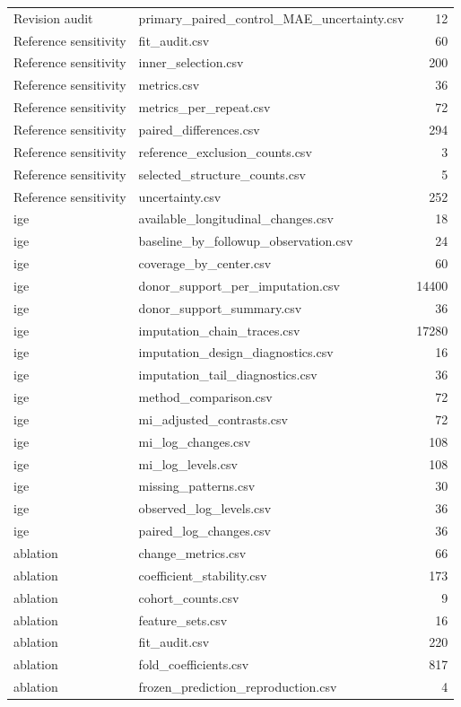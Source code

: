 \begin{longtable}{p{20mm}p{115mm}r}
Revision audit & primary\_paired\_control\_MAE\_uncertainty.csv & 12 \\
Reference sensitivity & fit\_audit.csv & 60 \\
Reference sensitivity & inner\_selection.csv & 200 \\
Reference sensitivity & metrics.csv & 36 \\
Reference sensitivity & metrics\_per\_repeat.csv & 72 \\
Reference sensitivity & paired\_differences.csv & 294 \\
Reference sensitivity & reference\_exclusion\_counts.csv & 3 \\
Reference sensitivity & selected\_structure\_counts.csv & 5 \\
Reference sensitivity & uncertainty.csv & 252 \\
ige & available\_longitudinal\_changes.csv & 18 \\
ige & baseline\_by\_followup\_observation.csv & 24 \\
ige & coverage\_by\_center.csv & 60 \\
ige & donor\_support\_per\_imputation.csv & 14400 \\
ige & donor\_support\_summary.csv & 36 \\
ige & imputation\_chain\_traces.csv & 17280 \\
ige & imputation\_design\_diagnostics.csv & 16 \\
ige & imputation\_tail\_diagnostics.csv & 36 \\
ige & method\_comparison.csv & 72 \\
ige & mi\_adjusted\_contrasts.csv & 72 \\
ige & mi\_log\_changes.csv & 108 \\
ige & mi\_log\_levels.csv & 108 \\
ige & missing\_patterns.csv & 30 \\
ige & observed\_log\_levels.csv & 36 \\
ige & paired\_log\_changes.csv & 36 \\
ablation & change\_metrics.csv & 66 \\
ablation & coefficient\_stability.csv & 173 \\
ablation & cohort\_counts.csv & 9 \\
ablation & feature\_sets.csv & 16 \\
ablation & fit\_audit.csv & 220 \\
ablation & fold\_coefficients.csv & 817 \\
ablation & frozen\_prediction\_reproduction.csv & 4 \\

\end{longtable}
